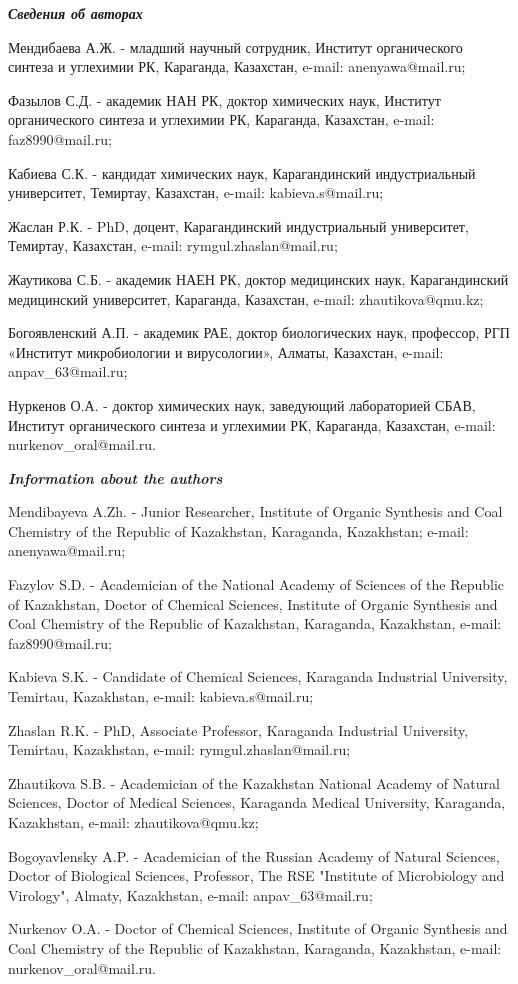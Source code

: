 \begin{info}
\hspace{1em}\emph{{\bfseries Сведения об авторах}}

Мендибаева А.Ж. - младший научный сотрудник, Институт органического
синтеза и углехимии РК, Караганда, Казахстан, e-mail:
anenyawa@mail.ru;

Фазылов С.Д. - академик НАН РК, доктор химических наук, Институт
органического синтеза и углехимии РК, Караганда, Казахстан, e-mail:
faz8990@mail.ru;

Кабиева С.К. - кандидат химических наук, Карагандинский индустриальный
университет, Темиртау, Казахстан, e-mail: kabieva.s@mail.ru;

Жаслан Р.К. - PhD, доцент, Карагандинский индустриальный университет,
Темиртау, Казахстан, e-mail: rymgul.zhaslan@mail.ru;

Жаутикова С.Б. - академик НАЕН РК, доктор медицинских наук,
Карагандинский медицинский университет, Караганда, Казахстан, e-mail:
zhautikova@qmu.kz;

Богоявленский А.П. - академик РАЕ, доктор биологических наук,
профессор, РГП «Институт микробиологии и вирусологии», Алматы,
Казахстан, e-mail: anpav\_63@mail.ru;

Нуркенов О.А. - доктор химических наук, заведующий лабораторией СБАВ,
Институт органического синтеза и углехимии РК, Караганда, Казахстан,
e-mail: nurkenov\_oral@mail.ru.

\hspace{1em}\emph{{\bfseries Information about the authors}}

Mendibayeva A.Zh. - Junior Researcher, Institute of Organic Synthesis
and Coal Chemistry of the Republic of Kazakhstan, Karaganda,
Kazakhstan; e-mail: anenyawa@mail.ru;

Fazylov S.D. - Academician of the National Academy of Sciences of the
Republic of Kazakhstan, Doctor of Chemical Sciences, Institute of
Organic Synthesis and Coal Chemistry of the Republic of Kazakhstan,
Karaganda, Kazakhstan, e-mail: faz8990@mail.ru;

Kabieva S.K. - Candidate of Chemical Sciences, Karaganda Industrial
University, Temirtau, Kazakhstan, e-mail: kabieva.s@mail.ru;

Zhaslan R.K. - PhD, Associate Professor, Karaganda Industrial
University, Temirtau, Kazakhstan, e-mail: rymgul.zhaslan@mail.ru;

Zhautikova S.B. - Academician of the Kazakhstan National Academy of
Natural Sciences, Doctor of Medical Sciences, Karaganda Medical
University, Karaganda, Kazakhstan, e-mail: zhautikova@qmu.kz;

Bogoyavlensky A.P. - Academician of the Russian Academy of Natural
Sciences, Doctor of Biological Sciences, Professor, The RSE "Institute
of Microbiology and Virology", Almaty, Kazakhstan, e-mail:
anpav\_63@mail.ru;

Nurkenov O.A. - Doctor of Chemical Sciences, Institute of Organic
Synthesis and Coal Chemistry of the Republic of Kazakhstan, Karaganda,
Kazakhstan, e-mail: nurkenov\_oral@mail.ru.
\end{info}
